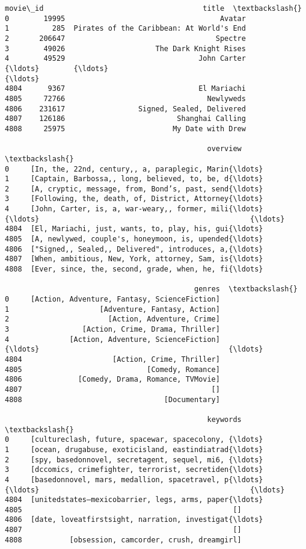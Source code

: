 \documentclass[11pt]{article}
\makeatletter
\newcommand{\boxspacing}{\kern\kvtcb@left@rule\kern\kvtcb@boxsep}
\newcommand{\prompt}[4]{
        {\ttfamily\llap{{\color{#2}[#3]:\hspace{3pt}#4}}\vspace{-\baselineskip}}
    }
\makeatother
\begin{document}
            \begin{tcolorbox}[breakable, size=fbox, boxrule=.5pt, pad at break*=1mm, opacityfill=0]
\prompt{Out}{outcolor}{65}{\boxspacing}
\begin{Verbatim}[commandchars=\\\{\}]
      movie\_id                                     title  \textbackslash{}
0        19995                                    Avatar
1          285  Pirates of the Caribbean: At World's End
2       206647                                   Spectre
3        49026                     The Dark Knight Rises
4        49529                               John Carter
{\ldots}        {\ldots}                                       {\ldots}
4804      9367                               El Mariachi
4805     72766                                 Newlyweds
4806    231617                 Signed, Sealed, Delivered
4807    126186                          Shanghai Calling
4808     25975                         My Date with Drew

                                               overview  \textbackslash{}
0     [In, the, 22nd, century,, a, paraplegic, Marin{\ldots}
1     [Captain, Barbossa,, long, believed, to, be, d{\ldots}
2     [A, cryptic, message, from, Bond’s, past, send{\ldots}
3     [Following, the, death, of, District, Attorney{\ldots}
4     [John, Carter, is, a, war-weary,, former, mili{\ldots}
{\ldots}                                                 {\ldots}
4804  [El, Mariachi, just, wants, to, play, his, gui{\ldots}
4805  [A, newlywed, couple's, honeymoon, is, upended{\ldots}
4806  ["Signed,, Sealed,, Delivered", introduces, a,{\ldots}
4807  [When, ambitious, New, York, attorney, Sam, is{\ldots}
4808  [Ever, since, the, second, grade, when, he, fi{\ldots}

                                            genres  \textbackslash{}
0     [Action, Adventure, Fantasy, ScienceFiction]
1                     [Adventure, Fantasy, Action]
2                       [Action, Adventure, Crime]
3                 [Action, Crime, Drama, Thriller]
4              [Action, Adventure, ScienceFiction]
{\ldots}                                            {\ldots}
4804                     [Action, Crime, Thriller]
4805                             [Comedy, Romance]
4806             [Comedy, Drama, Romance, TVMovie]
4807                                            []
4808                                 [Documentary]

                                               keywords  \textbackslash{}
0     [cultureclash, future, spacewar, spacecolony, {\ldots}
1     [ocean, drugabuse, exoticisland, eastindiatrad{\ldots}
2     [spy, basedonnovel, secretagent, sequel, mi6, {\ldots}
3     [dccomics, crimefighter, terrorist, secretiden{\ldots}
4     [basedonnovel, mars, medallion, spacetravel, p{\ldots}
{\ldots}                                                 {\ldots}
4804  [unitedstates–mexicobarrier, legs, arms, paper{\ldots}
4805                                                 []
4806  [date, loveatfirstsight, narration, investigat{\ldots}
4807                                                 []
4808           [obsession, camcorder, crush, dreamgirl]


\end{Verbatim}
\end{tcolorbox}
\end{document}
